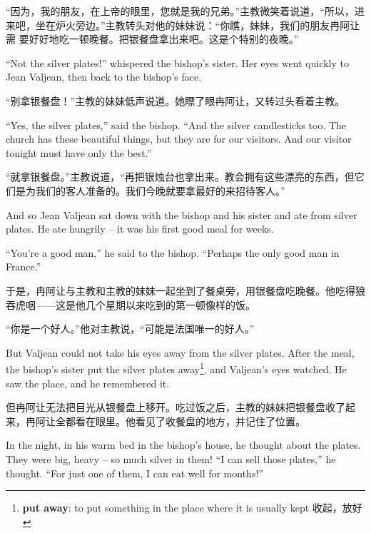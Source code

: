 \documentclass[fontset=ubuntu, zihao=5]{ctexart}
\begin{document}
\begin{paracol}{2}
  \switchcolumn

  “因为，我的朋友，在上帝的眼里，您就是我的兄弟。”主教微笑着说道，“所以，进
  来吧，坐在炉火旁边。”主教转头对他的妹妹说：“你瞧，妹妹，我们的朋友冉阿让需
  要好好地吃一顿晚餐。把银餐盘拿出来吧。这是个特别的夜晚。”

  \switchcolumn*

  ``Not the silver plates!'' whispered the bishop's sister. Her eyes went quickly to Jean Valjean, then back to the bishop's face.

  \switchcolumn

  “别拿银餐盘！”主教的妹妹低声说道。她瞟了眼冉阿让，又转过头看着主教。

  \switchcolumn*

  ``Yes, the silver plates,'' said the bishop. ``And the silver candlesticks too. The church has these beautiful things, but they are for our visitors. And our visitor tonight must have only the best.''

  \switchcolumn
  “就拿银餐盘。”主教说道，“再把银烛台也拿出来。教会拥有这些漂亮的东西，但它们是为我们的客人准备的。我们今晚就要拿最好的来招待客人。”

  \switchcolumn*

  And so Jean Valjean sat down with the bishop and his sister and ate from silver plates. He ate hungrily – it was his first good meal for weeks.

  ``You're a good man,'' he said to the bishop. ``Perhaps the only good man in France.''

  \switchcolumn
  于是，冉阿让与主教和主教的妹妹一起坐到了餐桌旁，用银餐盘吃晚餐。他吃得狼吞虎咽——这是他几个星期以来吃到的第一顿像样的饭。

  “你是一个好人。”他对主教说，“可能是法国唯一的好人。”

  \switchcolumn*

  But Valjean could not take his eyes away from the silver plates. After the meal, the bishop's sister put the silver plates away\footnote{\textbf{put away}: to put something in the place where it is usually kept 收起，放好}, and Valjean's eyes watched. He saw the place, and he remembered it.


  \switchcolumn
  但冉阿让无法把目光从银餐盘上移开。吃过饭之后，主教的妹妹把银餐盘收了起来，冉阿让全都看在眼里。他看见了收餐盘的地方，并记住了位置。

  \switchcolumn*

  In the night, in his warm bed in the bishop's house, he thought about the
  plates. They were big, heavy – so much silver in them! ``I can sell those
  plates,'' he thought. ``For just one of them, I can eat well for months!''


\end{paracol}
\end{document}
